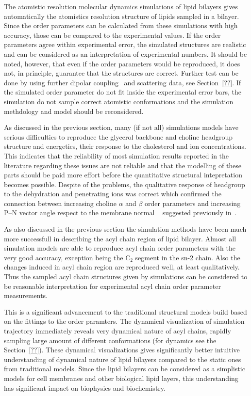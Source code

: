 \documentclass[aps,prl,superscriptaddress,twocolumn]{revtex4}
\begin{document}
The atomistic resolution molecular dynamics simulations of lipid bilayers gives automatically the 
atomistics resolution structure of lipids sampled in a bilayer. Since the order parameters can 
be calculated from these simulations with high accuracy, those can be compared to the experimental
values. If the order parameters agree within experimental error, the simulated structures are realistic
and can be considered as an interpretation of experimental numbers. 
It should be noted, however, that even if the order parameters would be reproduced, it does not, in principle, 
guarantee that the structures are correct. Further test can be done by using further dipolar coupling~\cite{??}
and scattering data, see Section~\ref{??}.
If the simulated order 
parameter do not fit inside the experimental error bars, the simulation do not sample correct
atomistic conformations and the simulation methdology and model should be reconsidered.

As discussed in the previous section, many (if not all) simulations models have serious difficulties
to reproduce the glycerol backbone and choline headgroup structure and energetics, their response
to the cholesterol and ion concentrations. This indicates that the reliability of most simulation results 
reported in the literature regarding these issues are not reliable and that the modelling of these
parts should be paid more effort before the quantitative structural intepretation becomes possible.
Despite of the problems, the qualitative response of headgroup to the dehydration and penetrating ions
was correct which confirmed the connection between increasing choline $\alpha$ and $\beta$ order parameters
and increasing P--N vector angle respect to the membrane normal ~\cite{??} suggested previously in~\cite{??}.

As also discussed in the previous section the simulation methods have been much more successfull in describing
the acyl chain region of lipid bilayer. Almost all simulation models are able to reproduce acyl chain
order parameters with the very good accuracy, exception being the C$_2$ segment in the sn-2 chain.
Also the changes induced in acyl chain region are reproduced well, at least qualitatively.
Thus the sampled acyl chain structures given by simulations can be considered to be reasonable
interpretation for experimental acyl chain order parameter measurements. 

This is a significant advancement to the traditional structural models build based on the 
fittings to the order paramters. The dynamical visualization of simulation trajectory immediately 
reveals very dynamical nature of acyl chains, rapidly sampling large amount of different conformations 
(for dynamics see the Section~\ref{??}). These dynamical visualizations gives significantly better
intuitive understanding of dynamical nature of lipid bilayers compared to the static ones from 
traditional models. Since the lipid bilayers can be considered as a simplistic models for cell
membranes and other biological lipid layers, this understanding has significant impact on
biophysics and biochemistry. 
\end{document}
